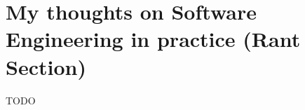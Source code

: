\documentclass[11pt,a4paper,sans]{moderncv}
\begin{document}
\section{My thoughts on Software Engineering in practice (Rant Section)}
TODO



\end{document}
